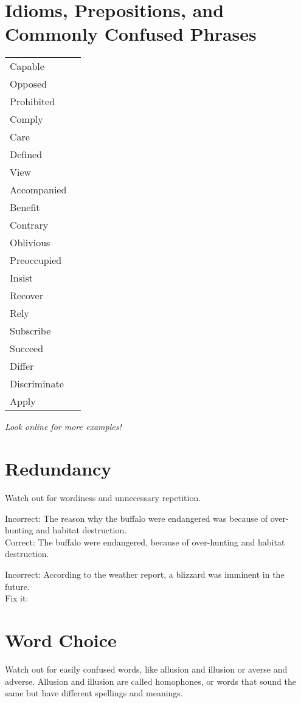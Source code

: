 \section{Idioms, Prepositions, and Commonly Confused Phrases}

\begin{spacing}{2}
\begin{tabular}{@{}ll<{\longline\arraybackslash}}
Capable&\\
Opposed&\\
Prohibited&\\
Comply&\\
Care&\\
Defined&\\
View&\\
Accompanied&\\
Benefit&\\
Contrary&\\
Oblivious&\\
Preoccupied&\\
Insist&\\
Recover&\\
Rely&\\
Subscribe&\\
Succeed&\\
Differ&\\
Discriminate&\\
Apply&
\end{tabular}
\end{spacing}

\textit{Look online for more examples!}

\section{Redundancy}
Watch out for wordiness and unnecessary repetition.

\bigskip
Incorrect:  The reason why the buffalo were endangered was because of over-hunting and habitat destruction.\\
Correct:  The buffalo were endangered, because of over-hunting and habitat destruction.

\bigskip
Incorrect:  According to the weather report, a blizzard was imminent in the future.\\
Fix it: \hrulefill

\section{Word Choice}
Watch out for easily confused words, like allusion and illusion or averse and adverse.  Allusion and illusion are called homophones, or words that sound the same but have different spellings and meanings.

